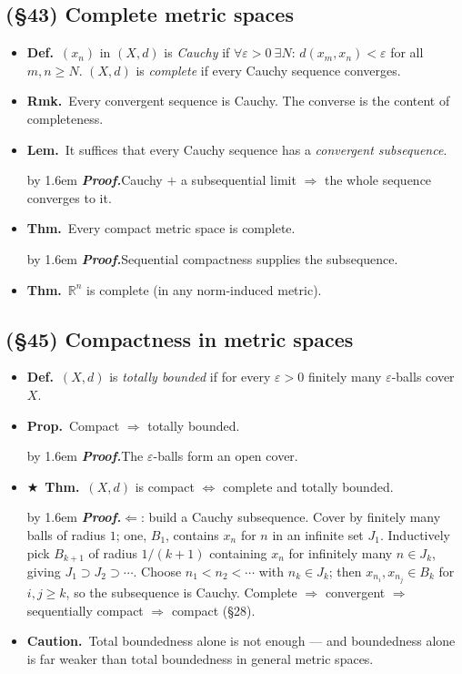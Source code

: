 \documentclass[12pt,a4paper]{article}
\newcommand{\Dfn}{\textbf{Def.}~}
\newcommand{\Thm}{\textbf{Thm.}~}
\newcommand{\Lem}{\textbf{Lem.}~}
\newcommand{\Prp}{\textbf{Prop.}~}
\newcommand{\Rmk}{\textbf{Rmk.}~}
\newcommand{\Warn}{\textbf{Caution.}~}
\newcommand{\Key}{$\bigstar$~}                  %
\newcommand{\Pf}[1]{%
  \par\addvspace{7pt}\nopagebreak
  \begingroup
    \advance\leftskip by 1.6em
    \parindent=0pt \small\color{prf}%
    \textbf{\textit{Proof.}}\enspace #1\par
  \endgroup
  \addvspace{9pt}}
\newenvironment{BL}%
  {\begin{itemize}[leftmargin=1.4em,labelsep=0.55em,itemsep=11pt,topsep=11pt,parsep=0pt]}%
  {\end{itemize}}
\newcommand{\RR}{\mathbb{R}}
\renewcommand{\iff}{\Leftrightarrow}
\newcommand{\imp}{\Rightarrow}
\begin{document}
\subsection{(\S43) Complete metric spaces}

\begin{BL}
\item \Dfn $(x_n)$ in $(X,d)$ is \emph{Cauchy} if $\forall\varepsilon>0\ \exists N$:
      $d(x_m,x_n)<\varepsilon$ for all $m,n\ge N$.
      $(X,d)$ is \emph{complete} if every Cauchy sequence converges.
\item \Rmk Every convergent sequence is Cauchy. The converse is the content of completeness.
\item \Lem It suffices that every Cauchy sequence has a \emph{convergent subsequence}.
\Pf{Cauchy $+$ a subsequential limit $\imp$ the whole sequence converges to it.}
\item \Thm Every compact metric space is complete.
      \Pf{Sequential compactness supplies the subsequence.}
\item \Thm $\RR^n$ is complete (in any norm-induced metric).
\end{BL}

\subsection{(\S45) Compactness in metric spaces}

\begin{BL}
\item \Dfn $(X,d)$ is \emph{totally bounded} if for every $\varepsilon>0$ finitely many
      $\varepsilon$-balls cover $X$.
\item \Prp Compact $\imp$ totally bounded. \Pf{The $\varepsilon$-balls form an open cover.}
\item \Key\Thm $(X,d)$ is compact $\iff$ complete and totally bounded.
\Pf{$\Leftarrow$: build a Cauchy subsequence. Cover by finitely many balls of radius $1$;
one, $B_1$, contains $x_n$ for $n$ in an infinite set $J_1$. Inductively pick $B_{k+1}$ of
radius $1/(k+1)$ containing $x_n$ for infinitely many $n\in J_k$, giving
$J_1\supset J_2\supset\cdots$. Choose $n_1<n_2<\cdots$ with $n_k\in J_k$;
then $x_{n_i},x_{n_j}\in B_k$ for $i,j\ge k$, so the subsequence is Cauchy.
Complete $\imp$ convergent $\imp$ sequentially compact $\imp$ compact (\S28).}
\item \Warn Total boundedness alone is not enough --- and boundedness alone is far weaker
      than total boundedness in general metric spaces.
\end{BL}
\end{document}
